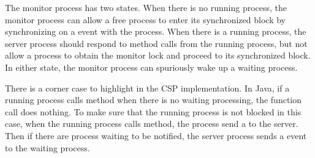 \documentclass{article}
\begin{document}
The monitor process has two states. When there is no running process, the monitor process can allow a free process to enter its synchronized block by synchronizing on a  event with the process. When there is a running process, the server process should respond to method calls from the running process, but not allow a process to obtain the monitor lock and proceed to its synchronized block. In either state, the monitor process can spuriously wake up a waiting process.

There is a corner case to highlight in the CSP implementation. In Java, if a running process calls  method when there is no waiting processing, the function call does nothing. To make sure that the running process is not blocked in this case, when the running process calls  method, the process send a  to the server. Then if there are process waiting to be notified, the server process sends a  event to the waiting process.
\end{document}
